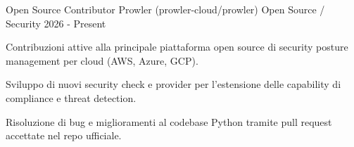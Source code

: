 \begin{cventries}
  \vspace{0.8cm}

  \cventry
  {Open Source Contributor}
  {Prowler (prowler-cloud/prowler)}
  {Open Source / Security}
  {2026 - Present}
  {
    \begin{cvitems}
      \item {Contribuzioni attive alla principale piattaforma open source di security posture management per cloud (AWS, Azure, GCP).}
      \item {Sviluppo di nuovi security check e provider per l'estensione delle capability di compliance e threat detection.}
      \item {Risoluzione di bug e miglioramenti al codebase Python tramite pull request accettate nel repo ufficiale.}
    \end{cvitems}
  }

\end{cventries}
